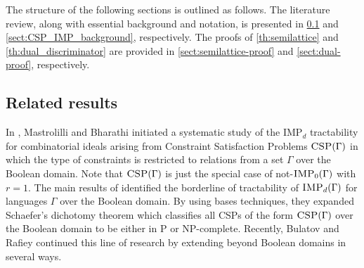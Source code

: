 \documentclass[11pt]{article}
\newcommand{\CSP}{\textsc{CSP}}
\newcommand{\IMP}{\textsc{IMP}}
\newcommand{\1}{\textbf{1}}
\newcommand{\GB}{\text{Gr\"{o}bner} }
\begin{document}
The structure of the following sections is outlined as follows. The literature review, along with essential background and notation, is presented in \cref{sect:csp_literature} and \cref{sect:CSP_IMP_background}, respectively. The proofs of \cref{th:semilattice} and \cref{th:dual_discriminator} are provided in \cref{sect:semilattice-proof} and \cref{sect:dual-proof}, respectively.
\subsection{Related results} \label{sect:csp_literature}
In \cite{Mastrolilli21TALG, BharathiM21}, Mastrolilli and Bharathi initiated a systematic study of the IMP$_d$ tractability for combinatorial ideals arising from Constraint Satisfaction Problems $\CSP(\Gamma)$ in which the type of constraints is restricted to relations from a set $\Gamma$ over the Boolean domain.
Note that $\CSP(\Gamma)$ is just the special case of not-$\IMP_0(\Gamma)$ with $r=1$.
The main results of \cite{Mastrolilli21TALG, BharathiM21} identified the borderline of tractability of $\IMP_d(\Gamma)$ for languages $\Gamma$ over the Boolean domain. By using \GB bases techniques, they expanded Schaefer's dichotomy theorem \cite{Schaefer78} which classifies all CSPs of the form $\CSP(\Gamma)$ over the Boolean domain to be either in P or NP-complete. Recently, Bulatov and Rafiey \cite{BulatovRSTOC22, BulatovRSTACS22} continued this line of research by extending \cite{Mastrolilli21TALG, BharathiM21} beyond Boolean domains in several ways. 
\end{document}

